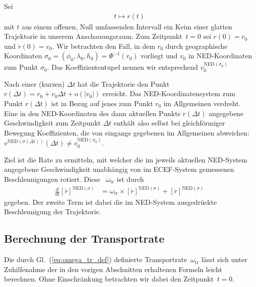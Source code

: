 \documentclass[10pt,a4paper]{article}
\newcommand{\mydef}[1]{\textls{#1}}
\begin{document}
Sei
\begin{align}
	t \mapsto r(t)
\end{align}
mit $t$ aus einem offenen, Null umfassenden Intervall ein Keim einer glatten Trajektorie in unserem Anschauungsraum.
Zum Zeitpunkt~$t=0$ sei $r(0)=r_0$ und $\dot{r}(0)=v_0$.
Wir betrachten den Fall, in dem $r_0$ durch geographische Koordinaten $\sigma_0=(\phi_0, \lambda_0, h_0)=\Phi^{-1}(r_0)$ vorliegt und $v_0$ in NED-Koordinaten zum Punkt $\sigma_0$. 
Das Koeffiziententupel nennen wir entsprechend $v_0^{\mathrm{NED}(\sigma_0)}$

Nach einer (kurzen) $\Delta t$ hat die Trajektorie den Punkt $r(\Delta t) = r_0 + v_0\Delta t + \mathrm{o}(|v_0|)$ erreicht.
Das NED-Koordinatensystem zum Punkt $r(\Delta t)$ ist in Bezug auf jenes zum Punkt $r_0$ im Allgemeinen verdreht.
Eine in den NED-Koordinaten des dann aktuellen Punkts $r(\Delta t)$ angegebene Geschwindigkeit zum Zeitpunkt $\Delta t$ enthält also selbst bei gleichförmiger Bewegung Koeffizienten, die von eingangs gegebenen im Allgemeinen abweichen: $v^{\mathrm{NED}(\sigma(\Delta t))}(\Delta t)\neq v_0^{\mathrm{NED}(\sigma_0)}$.

Ziel ist die Rate zu ermitteln, mit welcher die im jeweils aktuellen NED-System angegebene Geschwindigkeit unabhängig von im ECEF-System gemessenen Beschleunigungen rotiert.
Diese \mydef{Transportrate}~$\omega_{\mathrm{tr}}$ ist durch
\begin{align}
\label{eq:omega_tr_def}
	\frac{d}{dt}
	\left[
		\dot{r}
	\right]^{\mathrm{NED}(\sigma)}
	&=
	\omega_{\mathrm{tr}} 
	\times
	\left[
		\dot{r}
	\right]^{\mathrm{NED}(\sigma)}
	+ \left[
		\ddot{r}
	\right]^{\mathrm{NED}(\sigma)}
\end{align}
gegeben.
Der zweite Term ist dabei die im NED-System ausgedrückte Beschleunigung der Trajektorie.

\subsection{Berechnung der Transportrate}

Die durch Gl.~(\ref{eq:omega_tr_def}) definierte Transportrate~$\omega_{\mathrm{tr}}$ lässt sich unter Zuhilfenahme der in den vorigen Abschnitten erhaltenen Formeln leicht berechnen. 
Ohne Einschränkung betrachten wir dabei den Zeitpunkt~$t=0$.
\end{document}
